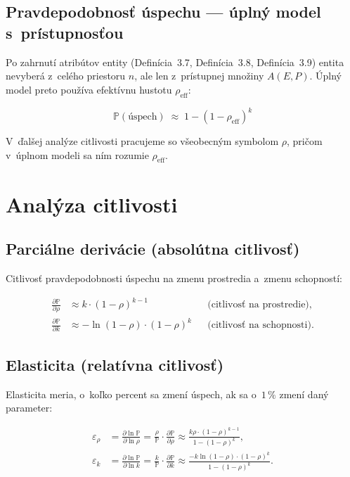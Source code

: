 \documentclass[12pt,a4paper]{article}
\begin{document}
\subsection{Pravdepodobnosť úspechu — úplný model s~prístupnosťou}

Po zahrnutí atribútov entity (Definícia~3.7, Definícia~3.8, Definícia~3.9) entita nevyberá z~celého priestoru $n$, ale len z~prístupnej množiny $A(E, P)$. Úplný model preto používa efektívnu hustotu $\rho_{\text{eff}}$:

\begin{equation}\label{eq:uplny}
    \boxed{\;\mathbb{P}(\text{úspech}) \;\approx\; 1 - (1 - \rho_{\text{eff}})^k\;}
\end{equation}

V~ďalšej analýze citlivosti pracujeme so všeobecným symbolom $\rho$, pričom v~úplnom modeli sa ním rozumie $\rho_{\text{eff}}$.

\section{Analýza citlivosti}

\subsection{Parciálne derivácie (absolútna citlivosť)}

Citlivosť pravdepodobnosti úspechu na zmenu prostredia a~zmenu schopností:

\begin{align}
    \frac{\partial \mathbb{P}}{\partial \rho} &\approx k \cdot (1-\rho)^{k-1} & &\text{(citlivosť na prostredie),} \label{eq:dP_drho} \\[6pt]
    \frac{\partial \mathbb{P}}{\partial k} &\approx -\ln(1-\rho) \cdot (1-\rho)^k & &\text{(citlivosť na schopnosti).} \label{eq:dP_dk}
\end{align}

\subsection{Elasticita (relatívna citlivosť)}

Elasticita meria, o~koľko percent sa zmení úspech, ak sa o~$1\,\%$ zmení daný parameter:

\begin{align}
    \varepsilon_\rho &= \frac{\partial \ln \mathbb{P}}{\partial \ln \rho} = \frac{\rho}{\mathbb{P}} \cdot \frac{\partial \mathbb{P}}{\partial \rho} \approx \frac{k\rho \cdot (1-\rho)^{k-1}}{1-(1-\rho)^k}, \label{eq:elast_rho} \\[6pt]
    \varepsilon_k &= \frac{\partial \ln \mathbb{P}}{\partial \ln k} = \frac{k}{\mathbb{P}} \cdot \frac{\partial \mathbb{P}}{\partial k} \approx \frac{-k\ln(1-\rho) \cdot (1-\rho)^k}{1-(1-\rho)^k}. \label{eq:elast_k}
\end{align}
\end{document}
